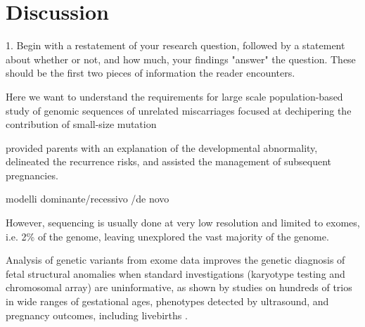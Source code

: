 \section*{Discussion}

1. Begin with a restatement of your research question, followed by a statement about whether or not, and how much, your findings "answer" the question.  These should be the first two pieces of information the reader encounters.


Here we want to understand the requirements for large scale population-based study of genomic sequences of unrelated miscarriages focused at dechipering the contribution of small-size mutation 

provided parents with an explanation of the developmental abnormality, delineated the recurrence risks, and assisted the management of subsequent pregnancies.



modelli dominante/recessivo /de novo 


 However, sequencing is usually done at very low resolution and limited to exomes, i.e. 2\% of the genome, leaving unexplored the vast majority of the genome. 
 
 
Analysis of genetic variants from exome data improves the genetic diagnosis of fetal structural anomalies when standard investigations (karyotype testing and chromosomal array) are uninformative, as shown by studies on hundreds of trios in wide ranges of gestational ages, phenotypes detected by ultrasound, and pregnancy outcomes, including livebirths \cite{petrovski2019whole, quinlan2019molecular, lord2019prenatal}. 






